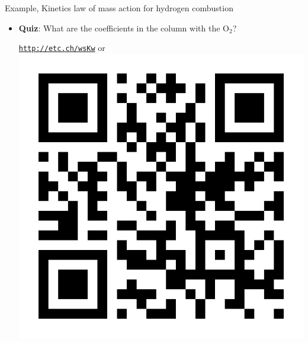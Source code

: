 \begin{frame}{Example, Kinetics law of mass action for hydrogen combustion}
\begin{itemize}
{{\[{				R_6 &  0 &  0 & -1 & 1 & 0 & \alert{*} & -1 & 0\\[5pt]
			}
			\]
			}
			\only<2>{
			\vskip 15pt
			\[
			\nu = 
			\kbordermatrix{
				& \mathsf{H} & \mathsf{H_2} & \mathsf{HO_2} & \mathsf{H_2O} & \mathsf{O} & \mathsf{O_2} & \mathsf{OH} & \mathsf{M} \\
				R_1 &   1 & -1 & 1 & 0 & 0 & \alert{-1} & 0 & 0\\[10pt]
				R_2 & -1 &  0 & 0 & 0 & 1 & \alert{-1} & 1 & 0\\[10pt]
				R_3 &   1 & -1 & 0 & 1 & 0 & \alert{0} & -1 & 0\\[5pt]
				R_4 &  1 & -1 & 0 & 0 & -1 & \alert{0} & 1 & 0\\[5pt]
				R_5 & -1 &  0 & 1 & 0 & 0 & \alert{-1} & 0 & 0\\[5pt]
				R_6 &  0 &  0 & -1 & 1 & 0 & \alert{1} & -1 & 0\\[5pt]
			}
			\]
			}
			}
			\ecol
	\vskip 5pt 
	\item \alert{\bf Quiz}: What are the coefficients in the column with the O$_2$? \\[5pt]
	\begin{center}
		\href{http://etc.ch/wsKw}{\textcolor{indigo(dye)}{\tt http://etc.ch/wsKw}} \quad or \quad
		\includegraphics[height=0.09\columnwidth]{figures/chemical-kinetics/polls.png}
	\end{center}
	\end{itemize}
\end{frame}
%

